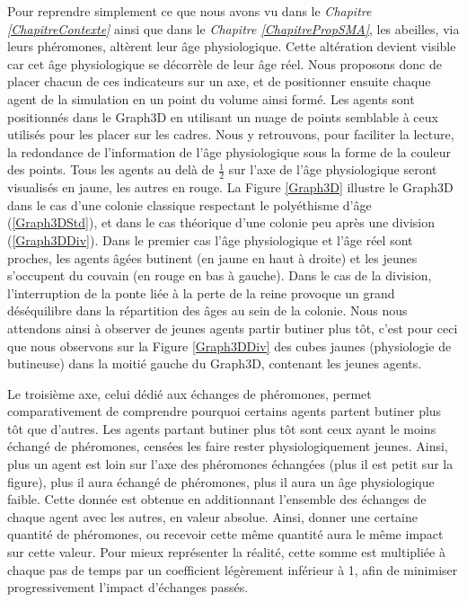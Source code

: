 		Pour reprendre simplement ce que nous avons vu dans le \textit{Chapitre \ref{ChapitreContexte}} ainsi que dans le \textit{Chapitre \ref{ChapitrePropSMA}}, les abeilles, via leurs phéromones, altèrent leur âge physiologique. Cette altération devient visible car cet âge physiologique se décorrèle de leur âge réel. Nous proposons donc de placer chacun de ces indicateurs sur un axe, et de positionner ensuite chaque agent de la simulation en un point du volume ainsi formé. Les agents sont positionnés dans le Graph3D en utilisant un nuage de points semblable à ceux utilisés pour les placer sur les cadres. Nous y retrouvons, pour faciliter la lecture, la redondance de l'information de l'âge physiologique sous la forme de la couleur des points. Tous les agents au delà de $\frac{1}{2}$ sur l'axe de l'âge physiologique seront visualisés en jaune, les autres en rouge.
		La Figure \ref{Graph3D} illustre le Graph3D dans le cas d'une colonie classique respectant le polyéthisme d'âge (\ref{Graph3DStd}), et dans le cas théorique d'une colonie peu après une division (\ref{Graph3DDiv}). Dans le premier cas l'âge physiologique et l'âge réel sont proches, les agents âgées butinent (en jaune en haut à droite) et les jeunes s'occupent du couvain (en rouge en bas à gauche). Dans le cas de la division, l'interruption de la ponte liée à la perte de la reine provoque un grand déséquilibre dans la répartition des âges au sein de la colonie. Nous nous attendons ainsi à observer de jeunes agents partir butiner plus tôt, c'est pour ceci que nous observons sur la Figure \ref{Graph3DDiv} des cubes jaunes (physiologie de butineuse) dans la moitié gauche du Graph3D, contenant les jeunes agents.
		
		Le troisième axe, celui dédié aux échanges de phéromones, permet comparativement de comprendre pourquoi certains agents partent butiner plus tôt que d'autres. Les agents partant butiner plus tôt sont ceux ayant le moins échangé de phéromones, censées les faire rester physiologiquement jeunes. Ainsi, plus un agent est loin sur l'axe des phéromones échangées (plus il est petit sur la figure), plus il aura échangé de phéromones, plus il aura un âge physiologique faible. Cette donnée est obtenue en additionnant l'ensemble des échanges de chaque agent avec les autres, en valeur absolue. Ainsi, donner une certaine quantité de phéromones, ou recevoir cette même quantité aura le même impact sur cette valeur. Pour mieux représenter la réalité, cette somme est multipliée à chaque pas de temps par un coefficient légèrement inférieur à 1, afin de minimiser progressivement l'impact d'échanges passés.
		

